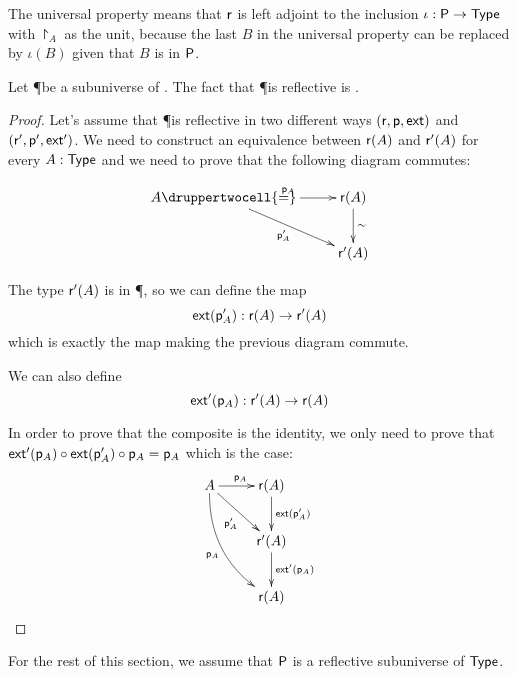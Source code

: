 The universal property means that $\reflect$ is left adjoint to the inclusion
$\iota:\P\to\type$ with $\project_A$ as the unit, because the last $B$ in the
universal property can be replaced by $\iota(B)$ given that $B$ is in $\P$.

\begin{lem}
  Let \P be a subuniverse of \type. The fact that \P is reflective is \anhprop.
\end{lem}

\begin{proof}
  Let’s assume that \P is reflective in two different ways
  $(\reflect,\project,\ext)$ and $(\reflect',\project',\ext')$. We need to
  construct an equivalence between $\reflect(A)$ and $\reflect'(A)$ for every
  $A:\type$ and we need to prove that the following diagram commutes:

  \[\uppercurveobject{{ }}\lowercurveobject{{ }}\twocellhead{{ }}
  \xymatrix{A \ar^{\project_A}[r] \ar_{\project'_A}[rd] \druppertwocell{=} &
    \reflect(A) \ar@{->}^\sim[d] \\
    & \reflect'(A)}\]

  The type $\reflect'(A)$ is in \P, so we can define the map
  \[\ext(\project'_A):\reflect(A)\to\reflect'(A)\]
  which is exactly the map making the previous diagram commute.

  We can also define
  \[\ext'(\project_A):\reflect'(A)\to\reflect(A)\]

  In order to prove that the composite is the identity, we only need to prove
  that $\ext'(\project_A)\circ\ext(\project'_A)\circ\project_A=\project_A$
  which is the case:
  \[\uppercurveobject{{ }}\lowercurveobject{{ }}\twocellhead{{ }}
  \xymatrix{A \ar^{\project_A}[r] \ar_{\project'_A}[rd]
    \ar@/_5mm/_{\project_A}[rdd] &
    \reflect(A) \ar@{->}^{\ext(\project'_A)}[d] \\
    & \reflect'(A) \ar@{->}^{\ext'(\project_A)}[d] \\
    & \reflect(A)}\]
\end{proof}

For the rest of this section, we assume that $\P$ is a reflective subuniverse of
$\type$.

